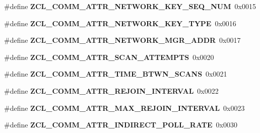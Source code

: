\begin{DoxyCompactItemize}
\item 
\hypertarget{group__zcl__commissioning_ga46aa2ae4df74769780e5fdcb9024ae1a}{\#define {\bfseries Z\-C\-L\-\_\-\-C\-O\-M\-M\-\_\-\-A\-T\-T\-R\-\_\-\-N\-E\-T\-W\-O\-R\-K\-\_\-\-K\-E\-Y\-\_\-\-S\-E\-Q\-\_\-\-N\-U\-M}~0x0015}\label{group__zcl__commissioning_ga46aa2ae4df74769780e5fdcb9024ae1a}

\item 
\hypertarget{group__zcl__commissioning_ga2a0adae89092d9dc34bfcffb04b63a6a}{\#define {\bfseries Z\-C\-L\-\_\-\-C\-O\-M\-M\-\_\-\-A\-T\-T\-R\-\_\-\-N\-E\-T\-W\-O\-R\-K\-\_\-\-K\-E\-Y\-\_\-\-T\-Y\-P\-E}~0x0016}\label{group__zcl__commissioning_ga2a0adae89092d9dc34bfcffb04b63a6a}

\item 
\hypertarget{group__zcl__commissioning_ga0230f3f6ddeb8d847ec5595bb988ed67}{\#define {\bfseries Z\-C\-L\-\_\-\-C\-O\-M\-M\-\_\-\-A\-T\-T\-R\-\_\-\-N\-E\-T\-W\-O\-R\-K\-\_\-\-M\-G\-R\-\_\-\-A\-D\-D\-R}~0x0017}\label{group__zcl__commissioning_ga0230f3f6ddeb8d847ec5595bb988ed67}

\item 
\hypertarget{group__zcl__commissioning_ga0337c6309978b8f91597fd5e61e887ed}{\#define {\bfseries Z\-C\-L\-\_\-\-C\-O\-M\-M\-\_\-\-A\-T\-T\-R\-\_\-\-S\-C\-A\-N\-\_\-\-A\-T\-T\-E\-M\-P\-T\-S}~0x0020}\label{group__zcl__commissioning_ga0337c6309978b8f91597fd5e61e887ed}

\item 
\hypertarget{group__zcl__commissioning_ga3eddf67a9cc62af2c22cd24f659f1b18}{\#define {\bfseries Z\-C\-L\-\_\-\-C\-O\-M\-M\-\_\-\-A\-T\-T\-R\-\_\-\-T\-I\-M\-E\-\_\-\-B\-T\-W\-N\-\_\-\-S\-C\-A\-N\-S}~0x0021}\label{group__zcl__commissioning_ga3eddf67a9cc62af2c22cd24f659f1b18}

\item 
\hypertarget{group__zcl__commissioning_ga9e0d16cb6839223fe1dca2a1d3703c7b}{\#define {\bfseries Z\-C\-L\-\_\-\-C\-O\-M\-M\-\_\-\-A\-T\-T\-R\-\_\-\-R\-E\-J\-O\-I\-N\-\_\-\-I\-N\-T\-E\-R\-V\-A\-L}~0x0022}\label{group__zcl__commissioning_ga9e0d16cb6839223fe1dca2a1d3703c7b}

\item 
\hypertarget{group__zcl__commissioning_gab193b58cf6028a80b575eb9037d5bc38}{\#define {\bfseries Z\-C\-L\-\_\-\-C\-O\-M\-M\-\_\-\-A\-T\-T\-R\-\_\-\-M\-A\-X\-\_\-\-R\-E\-J\-O\-I\-N\-\_\-\-I\-N\-T\-E\-R\-V\-A\-L}~0x0023}\label{group__zcl__commissioning_gab193b58cf6028a80b575eb9037d5bc38}

\item 
\hypertarget{group__zcl__commissioning_gaf6b67081eaae4edd85f9293536b90469}{\#define {\bfseries Z\-C\-L\-\_\-\-C\-O\-M\-M\-\_\-\-A\-T\-T\-R\-\_\-\-I\-N\-D\-I\-R\-E\-C\-T\-\_\-\-P\-O\-L\-L\-\_\-\-R\-A\-T\-E}~0x0030}\label{group__zcl__commissioning_gaf6b67081eaae4edd85f9293536b90469}


\end{DoxyCompactItemize}
